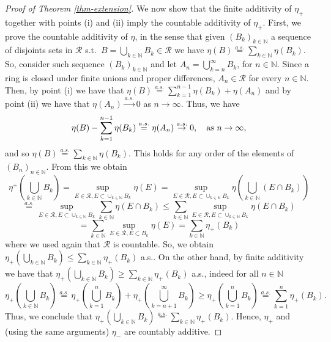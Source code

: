 \documentclass{article}
\theoremstyle{plain}
\theoremstyle{remark}
\begin{document}
\begin{proof}[Proof of Theorem \ref{thm-extension}]
	We now show that the finite additivity of $\eta_+$ together with points (i) and (ii) imply the countable additivity of $\eta_+$. First, we prove the countable additivity of $\eta$, in the sense that given $(B_k)_{k\in\mathbb{N}}$ a sequence of disjoints sets in $\mathcal{R}$ s.t.~$B=\bigcup_{k\in\mathbb{N}}B_k\in\mathcal{R}$ we have $\eta(B)\stackrel{a.s.}{=}\sum_{k\in\mathbb{N}}\eta(B_k)$. So, consider such sequence $(B_k)_{k\in\mathbb{N}}$ and let $A_n=\bigcup_{k=n}^\infty B_k$, for $n\in\mathbb{N}$. Since a ring is closed under finite unions and proper differences, $A_n\in\mathcal{R}$ for every $n\in\mathbb{N}$. Then, by point (i) we have that $\eta(B)\stackrel{a.s.}{=}\sum_{k=1}^{n-1}\eta(B_k) +\eta(A_n)$ and by point (ii) we have that $\eta(A_n)\stackrel{a.s.}{\to}0$ as $n\to\infty$. Thus, we have
	\begin{equation*}
		\eta(B)-\sum_{k=1}^{n-1}\eta(B_k)\stackrel{a.s.}{=}\eta(A_n)\stackrel{a.s.}{\to}0,\quad\textnormal{as $n\to\infty$},
	\end{equation*}
	and so $\eta(B)\stackrel{a.s.}{=}\sum_{k\in\mathbb{N}}\eta(B_k)$. This holds for any order of the elements of $(B_n)_{n\in\mathbb{N}}$. From this we obtain
	\begin{equation*}
		\eta^+\left(\bigcup_{k\in\mathbb{N}}B_k\right)=\sup_{E\in \mathcal{R}, E\subset \cup_{k\in\mathbb{N}}B_k} \eta(E)=\sup_{E\in \mathcal{R}, E\subset \cup_{k\in\mathbb{N}}B_k} \eta\left(\bigcup_{k\in\mathbb{N}}(E\cap B_k)\right)
	\end{equation*}
	\begin{equation*}
		\stackrel{a.s.}{=}\sup_{E\in \mathcal{R}, E\subset \cup_{k\in\mathbb{N}}B_k} \sum_{k\in\mathbb{N}}\eta(E\cap B_k)\leq \sum_{k\in\mathbb{N}} \sup_{E\in \mathcal{R}, E\subset \cup_{k\in\mathbb{N}}B_k} \eta(E\cap B_k)
	\end{equation*}
	\begin{equation*}
		=\sum_{k\in\mathbb{N}} \sup_{E\in \mathcal{R}, E\subset B_k} \eta(E)=\sum_{k\in\mathbb{N}}\eta_+(B_k)
	\end{equation*}
	where we used again that $\mathcal{R}$ is countable. So, we obtain $		\eta_+\left(\bigcup_{k\in\mathbb{N}}B_k\right)\leq \sum_{k\in\mathbb{N}}\eta_+(B_k)$ a.s.. On the other hand, by finite additivity we have that $		\eta_+\left(\bigcup_{k\in\mathbb{N}}B_k\right)\geq \sum_{k\in\mathbb{N}}\eta_+(B_k)$ a.s., indeed for all $n\in\mathbb{N}$
	\begin{equation*}
		\eta_+\left(\bigcup_{k\in\mathbb{N}}B_k\right)\stackrel{a.s.}{=}\eta_+\left(\bigcup_{k=1}^{n}B_k\right)+\eta_+\left(\bigcup_{k=n+1}^{\infty}B_k\right)\geq \eta_+\left(\bigcup_{k=1}^{n}B_k\right)\stackrel{a.s.}{=} \sum_{k=1}^n\eta_+(B_k).
	\end{equation*}
	Thus, we conclude that $\eta_+(\bigcup_{k\in\mathbb{N}}B_k)\stackrel{a.s.}{=} \sum_{k\in\mathbb{N}}\eta_+(B_k)$. Hence, $\eta_+$ and (using the same arguments) $\eta_-$ are countably additive.
	

\end{proof}
\end{document}
